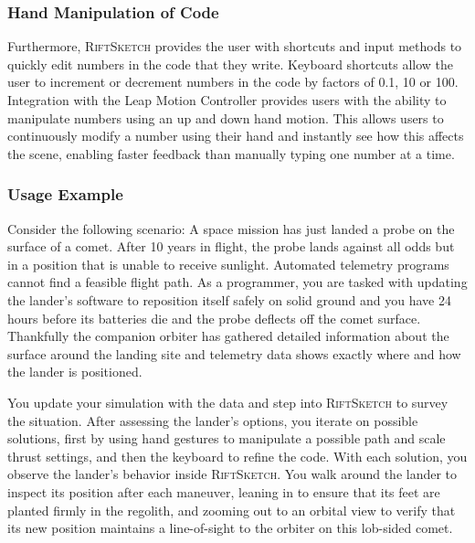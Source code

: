 \documentclass[conference]{IEEEtran}
\begin{document}
\subsubsection{Hand Manipulation of Code}

Furthermore, \textsc{RiftSketch} provides the user with shortcuts and input methods to quickly edit numbers in the code that they write. 
Keyboard shortcuts allow the user to increment or decrement numbers in the code by factors of 0.1, 10 or 100. 
Integration with the Leap Motion Controller provides users with the ability to manipulate numbers using an up and down hand motion.
This allows users to continuously modify a number using their hand and instantly see how this affects the scene, enabling faster feedback than manually typing one number at a time.




\subsubsection{Usage Example}
Consider the following scenario: A space mission has just landed a probe on the surface of a comet.
After 10 years in flight, the probe lands against all odds but in a position that is unable to receive sunlight.
Automated telemetry programs cannot find a feasible flight path.
As a programmer, you are tasked with updating the lander's software to reposition itself safely on solid ground and you have 24 hours before its batteries die and the probe deflects off the comet surface. 
Thankfully the companion orbiter has gathered detailed information about the surface around the landing site and telemetry data shows exactly where and how the lander is positioned.

You update your simulation with the data and step into \textsc{RiftSketch} to survey the situation. 
After assessing the lander's options, you iterate on possible solutions, first by using hand gestures to manipulate a possible path and scale thrust settings, 
and then the keyboard to refine the code. 
With each solution, you observe the lander's behavior inside \textsc{RiftSketch}.
You walk around the lander to inspect its position after each maneuver, leaning in to ensure that its feet are planted firmly in the regolith, and zooming out to an orbital view to verify that its new position maintains a line-of-sight to the orbiter on this lob-sided comet. 
\end{document}
